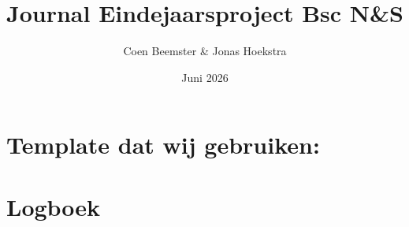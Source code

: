 \documentclass{article}
\title{Journal Eindejaarsproject Bsc N\&S}
\author{Coen Beemster \& Jonas Hoekstra}
\date{Juni 2026}
\begin{document}
\maketitle

\section{Template dat wij gebruiken:}


\newpage 
\section{Logboek}



\end{document}
